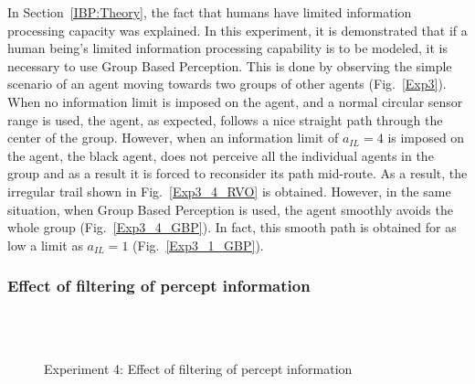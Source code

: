 In Section~\ref{IBP:Theory}, the fact that humans have limited information processing capacity was explained. In this experiment, it is demonstrated that if a human being's limited information processing capability is to be modeled, it is necessary to use Group Based Perception. This is done by observing the simple scenario of an agent moving towards two groups of other agents (Fig.~\ref{Exp3}). When no information limit is imposed on the agent, and a normal circular sensor range is used, the agent, as expected, follows a nice straight path through the center of the group. However, when an information limit of $a_{IL} = 4$ is imposed on the agent, the black agent, does not perceive all the individual agents in the group and  as a result it is forced to reconsider its path mid-route. As a result, the irregular trail shown in Fig.~\ref{Exp3_4_RVO} is obtained. However, in the same situation, when Group Based Perception is used, the agent smoothly avoids the whole group (Fig.~\ref{Exp3_4_GBP}). In fact, this smooth path is obtained for as low a limit as $a_{IL} = 1$ (Fig.~\ref{Exp3_1_GBP}).

\subsubsection{Effect of filtering of percept information}

\begin{figure}[!tb]
  \centering
   \\
  \hspace{1pt}
  \\
  \hspace{1pt}
  \caption{Experiment 4: Effect of filtering of percept information}
  \label{Exp4}
\end{figure}

